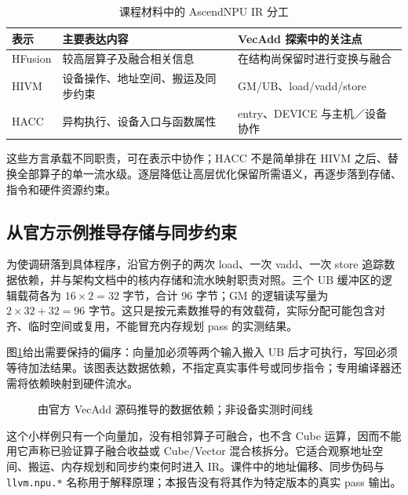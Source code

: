 \documentclass[UTF8,a4paper,10pt,fontset=fandol]{ctexart}
\begin{document}
\begin{table}[H]
\centering\small
\caption{课程材料中的 AscendNPU IR 分工}\label{tab:ascend}
\begin{tabularx}{\textwidth}{lXX}
\toprule
表示 & 主要表达内容 & VecAdd 探索中的关注点\\
\midrule
HFusion & 较高层算子及融合相关信息 & 在结构尚保留时进行变换与融合\\
HIVM & 设备操作、地址空间、搬运及同步约束 & GM/UB、load/vadd/store\\
HACC & 异构执行、设备入口与函数属性 & entry、DEVICE 与主机／设备协作\\
\bottomrule
\end{tabularx}
\end{table}
这些方言承载不同职责，可在表示中协作；HACC 不是简单排在 HIVM 之后、替换全部算子的单一流水级。逐层降低让高层优化保留所需语义，再逐步落到存储、指令和硬件资源约束。

\subsection{从官方示例推导存储与同步约束}
为使调研落到具体程序，沿官方例子的两次 load、一次 vadd、一次 store 追踪数据依赖，并与架构文档中的核内存储和流水映射职责对照\cite{ascendarch}。三个 UB 缓冲区的逻辑载荷各为 $16\times2=32$ 字节，合计 96 字节；GM 的逻辑读写量为 $2\times32+32=96$ 字节。这只是按元素数推导的有效载荷，实际分配可能包含对齐、临时空间或复用，不能冒充内存规划 pass 的实测结果。

图\ref{fig:ascenddeps}给出需要保持的偏序：向量加必须等两个输入搬入 UB 后才可执行，写回必须等待加法结果。该图表达数据依赖，不指定真实事件号或同步指令；专用编译器还需将依赖映射到硬件流水。
\begin{figure}[H]
\centering\small
{}
\caption{由官方 VecAdd 源码推导的数据依赖；非设备实测时间线}\label{fig:ascenddeps}
\end{figure}
这个小样例只有一个向量加，没有相邻算子可融合，也不含 Cube 运算，因而不能用它声称已验证算子融合收益或 Cube/Vector 混合核拆分。它适合观察地址空间、搬运、内存规划和同步约束何时进入 IR。课件中的地址偏移、同步伪码与 \texttt{llvm.npu.*} 名称用于解释原理；本报告没有将其作为特定版本的真实 pass 输出。
\end{document}
